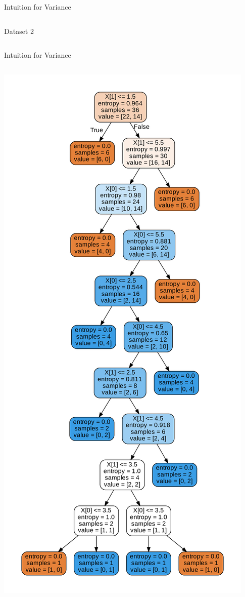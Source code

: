 \documentclass{beamer}
\begin{document}
\begin{frame}{Intuition for Variance}
\begin{columns}
\begin{column}{0.5\textwidth}{\hspace{1.75cm} Dataset 2}
\begin{center}
			\end{center}
		\end{column}
	\end{columns}
	\end{frame}


	\begin{frame}{Intuition for Variance}
	\begin{columns}
		\begin{column}{0.5\textwidth}
			\begin{center}
			\includegraphics[scale=0.2]{var_1}

\end{center}
\end{column}
\end{columns}
\end{frame}
\end{document}
